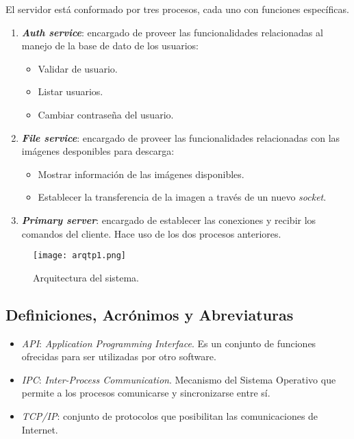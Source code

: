 \documentclass[12pt,a4paper]{article}
\begin{document}
El servidor está conformado por tres procesos, cada uno con funciones específicas.

\begin{enumerate}[leftmargin=1.5cm]
  \item \textbf{\emph{Auth service}}: encargado de proveer las funcionalidades relacionadas
  al manejo de la base de dato de los usuarios:

  \begin{itemize}[leftmargin=1cm, nosep]
    \item Validar de usuario.
    \item Listar usuarios.
    \item Cambiar contraseña del usuario.
  \end{itemize}

  \item \textbf{\emph{File service}}: encargado de proveer las funcionalidades relacionadas
  con las imágenes desponibles para descarga:

  \begin{itemize}[leftmargin=1cm, nosep]
    \item Mostrar información de las imágenes disponibles.
    \item Establecer la transferencia de la imagen a través de un nuevo
    \emph{socket}.
  \end{itemize}

  \item \textbf{\emph{Primary server}}: encargado de establecer las conexiones y recibir
  los comandos del cliente. Hace uso de los dos procesos anteriores.
\end{enumerate}

\begin{figure}[H]
  \centering
  \texttt{[image: arqtp1.png]}
  \caption{Arquitectura del sistema.}
  \label{arqui}
\end{figure}

\newpage

\subsection{Definiciones, Acrónimos y Abreviaturas}
\label{daa}

\begin{itemize}
  \item \emph{API}: \emph{Application Programming Interface}. Es un conjunto
  de funciones ofrecidas para ser utilizadas por otro software.
  \item \emph{IPC}: \emph{Inter-Process Communication}. Mecanismo del Sistema
  Operativo que permite a los procesos comunicarse y sincronizarse entre sí.
  \item \emph{TCP/IP}: conjunto de protocolos que posibilitan las comunicaciones
  de Internet.
\end{itemize}
\end{document}
